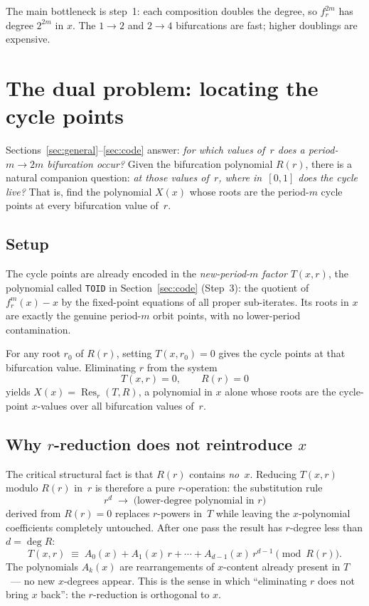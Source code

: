 \documentclass[11pt]{article}
\begin{document}
The main bottleneck is step~1: each composition doubles the degree, so
$f_r^{2m}$ has degree $2^{2m}$ in $x$.  The $1\to 2$ and $2\to 4$ bifurcations
are fast; higher doublings are expensive.

\section{The dual problem: locating the cycle points}
\label{sec:dual}

Sections~\ref{sec:general}--\ref{sec:code} answer: \emph{for which values of~$r$
does a period-$m\to2m$ bifurcation occur?}  Given the bifurcation polynomial
$R(r)$, there is a natural companion question: \emph{at those values of~$r$,
where in~$[0,1]$ does the cycle live?}  That is, find the polynomial $X(x)$
whose roots are the period-$m$ cycle points at every bifurcation value of~$r$.

\subsection{Setup}

The cycle points are already encoded in the \emph{new-period-$m$ factor}
$T(x,r)$, the polynomial called \texttt{TOID} in Section~\ref{sec:code}
(Step~3): the quotient of $f_r^m(x)-x$ by the fixed-point equations of all
proper sub-iterates.  Its roots in $x$ are exactly the genuine period-$m$ orbit
points, with no lower-period contamination.

For any root $r_0$ of $R(r)$, setting $T(x,r_0)=0$ gives the cycle points at
that bifurcation value.  Eliminating $r$ from the system
\begin{equation}
\label{eq:dual-system}
T(x,r) = 0, \qquad R(r) = 0
\end{equation}
yields $X(x) = \operatorname{Res}_r(T,R)$, a polynomial in $x$ alone whose
roots are the cycle-point $x$-values over all bifurcation values of~$r$.

\subsection{Why $r$-reduction does not reintroduce $x$}

The critical structural fact is that $R(r)$ contains \emph{no~$x$}.  Reducing
$T(x,r)$ modulo $R(r)$ in~$r$ is therefore a pure $r$-operation: the
substitution rule
\[
r^d \;\longrightarrow\; \text{(lower-degree polynomial in }r\text{)}
\]
derived from $R(r)=0$ replaces $r$-powers in~$T$ while leaving the
$x$-polynomial coefficients completely untouched.  After one pass the result has
$r$-degree less than $d = \deg R$:
\begin{equation}
\label{eq:Tmod}
T(x,r) \;\equiv\; A_0(x) + A_1(x)\,r + \cdots + A_{d-1}(x)\,r^{d-1}
\pmod{R(r)}.
\end{equation}
The polynomials $A_k(x)$ are rearrangements of $x$-content already present in
$T$~--- no new $x$-degrees appear.  This is the sense in which ``eliminating
$r$ does not bring $x$ back'': the $r$-reduction is orthogonal to $x$.
\end{document}
